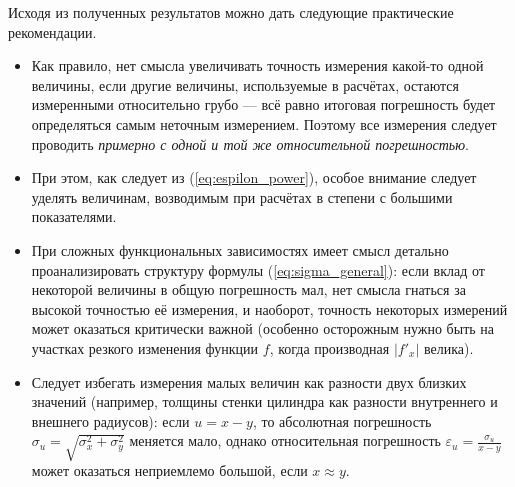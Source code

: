 Исходя из полученных результатов можно дать следующие практические рекомендации.
\begin{itemize}\small
\item Как правило, нет смысла увеличивать точность измерения какой-то одной величины, если другие величины, используемые в расчётах, остаются
измеренными относительно грубо --- всё равно итоговая погрешность
будет определяться самым неточным измерением. 
Поэтому все измерения следует проводить \emph{примерно с одной и той же относительной погрешностью}.
\item При этом, как следует из (\ref{eq:espilon_power}), особое внимание следует уделять величинам, возводимым при расчётах в степени с большими показателями. 
\item При сложных функциональных зависимостях
имеет смысл детально проанализировать структуру формулы
(\ref{eq:sigma_general}):
если вклад от некоторой величины в общую погрешность мал, нет смысла
гнаться за высокой точностью её измерения, и наоборот, точность некоторых измерений может оказаться критически важной 
(особенно осторожным нужно быть на участках резкого
изменения функции $f$, когда производная $|f'_x|$ велика).
\item Следует избегать измерения малых величин как разности двух близких
значений (например, толщины стенки цилиндра как разности внутреннего
и внешнего радиусов): если $u=x-y$, то абсолютная погрешность
$\sigma_{u}=\sqrt{\sigma_{x}^{2}+\sigma_{y}^{2}}$
меняется мало, однако относительная погрешность
$\varepsilon_{u}=\frac{\sigma_{u}}{x-y}$
может оказаться неприемлемо большой, если $x\approx y$.
\end{itemize}


